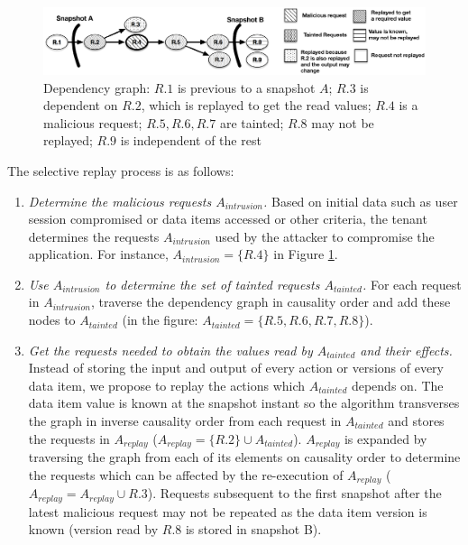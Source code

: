 \begin{figure}
\centering
\includegraphics[width=150mm]{images/selectiveDependency_legended}
\caption[Dependency graph]{Dependency graph: $R.1$ is previous to a snapshot $A$; $R.3$ is dependent on $R.2$, which is replayed to get the read values; $R.4$ is a malicious request; $R.5,R.6,R.7$ are tainted; $R.8$ may not be replayed; $R.9$ is independent of the rest}
\label{fig:selectiveGraph}
\end{figure}

The selective replay process is as follows:
\begin{enumerate}
\item \textit{Determine the malicious requests $A_{intrusion}$.}
Based on initial data such as user session compromised or data items accessed or other criteria, the tenant determines the requests $A_{intrusion}$ used by the attacker to compromise the application. For instance, $A_{intrusion} = \{R.4\} $ in Figure \ref{fig:selectiveGraph}.

\item \textit{Use $A_{intrusion}$ to determine the set of tainted requests $A_{tainted}$.}
For each request in $A_{intrusion}$, traverse the dependency graph in causality order and add these nodes to $A_{tainted}$ (in the figure: $A_{tainted} = \{R.5,R.6,R.7,R.8\}$).


\item \textit{Get the requests needed to obtain the values read by $A_{tainted}$ and their effects.} 
Instead of storing the input and output of every action or versions of every data item, we propose to replay the actions which $A_{tainted}$ depends on. The data item value is known at the snapshot instant so the algorithm transverses the graph in inverse causality order from each request in $A_{tainted}$ and stores the requests in $A_{replay}$ ($A_{replay} = \{R.2\} \cup A_{tainted}$). $A_{replay}$ is expanded by traversing the graph from each of its elements on causality order to determine the requests which can be affected by the re-execution of $A_{replay}$ ($A_{replay} = A_{replay} \cup R.3$). Requests subsequent to the first snapshot after the latest malicious request may not be repeated as the data item version is known (version read by $R.8$ is stored in snapshot B).


\end{enumerate}
